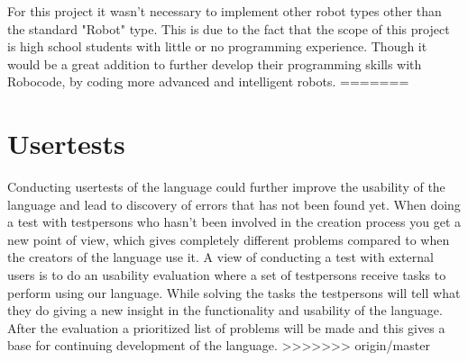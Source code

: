 For this project it wasn't necessary to implement other robot types other than the standard "Robot" type. This is due to the fact that the scope of this project is high school students with little or no programming experience. Though it would be a great addition to further develop their programming skills with Robocode, by coding more advanced and intelligent robots.
=======
\section{Usertests}
Conducting usertests of the language could further improve the usability of the language and lead to discovery of errors that has not been found yet. When doing a test with testpersons who hasn't been involved in the creation process you get a new point of view, which gives completely different problems compared to when the creators of the language use it. 
A view of conducting a test with external users is to do an usability evaluation where a set of testpersons receive tasks to perform using our language. While solving the tasks the testpersons will tell what they do giving a new insight in the functionality and usability of the language. 
After the evaluation a prioritized list of problems will be made and this gives a base for continuing development of the language. 
>>>>>>> origin/master
